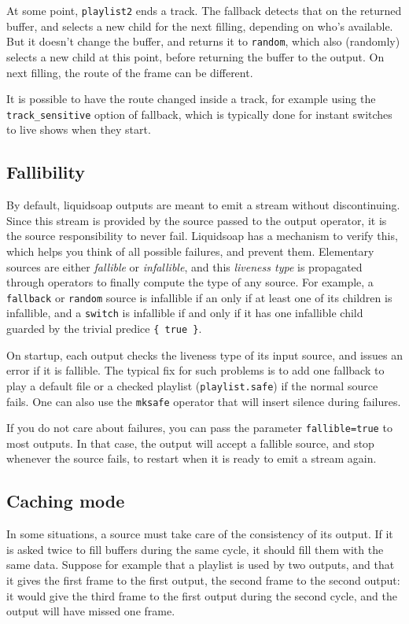 At some point, \verb+playlist2+ ends a track.
The fallback detects that on the returned buffer,
and selects a new child for the next filling,
depending on who's available.
But it doesn't change the buffer, and returns it to \verb+random+,
which also (randomly) selects a new child at this point,
before returning the buffer to the output.
On next filling, the route of the frame can be different.

It is possible to have the route changed inside a track,
for example using the \verb+track_sensitive+ option of fallback,
which is typically done for instant switches to live shows when they start.

\subsection{Fallibility}
By default, liquidsoap outputs are meant to emit a stream without
discontinuing. Since this stream is provided by the source passed to the
output operator, it is the source responsibility to never fail.
Liquidsoap has a mechanism to verify this, which helps you think of
all possible failures, and prevent them.
Elementary sources are either \emph{fallible} or \emph{infallible}, and this
\emph{liveness type} is propagated through operators to finally
compute the type of any source.
For example,
a \verb+fallback+ or \verb+random+ source is infallible
if an only if at least one of its children is infallible,
and a \verb+switch+ is infallible if and only if it has one infallible
child guarded by the trivial predice \verb+{ true }+.

On startup, each output checks the liveness type of its input source,
and issues an error if it is fallible. The typical fix for such problems
is to add one fallback to play a default file or a checked playlist
(\verb+playlist.safe+) if the normal source fails.
One can also use the \verb+mksafe+ operator that will insert silence
during failures.

If you do not care about failures, you can pass the parameter 
\verb+fallible=true+ to most outputs. In that case, the output
will accept a fallible source, and stop whenever the source fails,
to restart when it is ready to emit a stream again.

\subsection{Caching mode}
In some situations, a source must take care of the consistency of its 
output. If it is asked twice to fill buffers during the same cycle, it 
should fill them with the same data. Suppose for example that a playlist is 
used by two outputs, and that it gives the first frame to the first 
output, the second frame to the second output: it would give the third frame 
to the first output during the second cycle,
and the output will have missed one frame.

